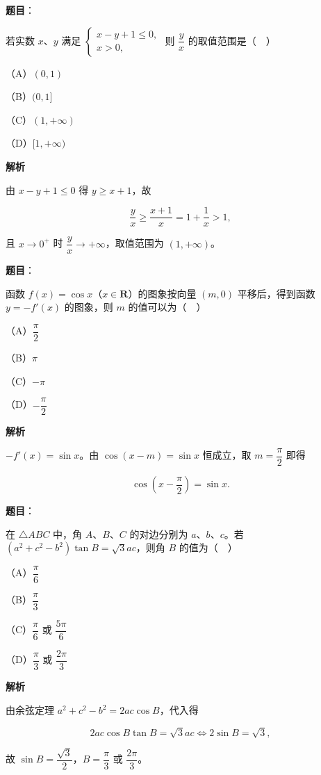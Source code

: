 \begin{answer}

\textbf{题目}：

若实数 $x$、$y$ 满足 $\begin{cases}x-y+1\leqslant0,\\ x>0,\end{cases}$ 则 $\dfrac yx$ 的取值范围是（　）

（A）$(0,1)$

（B）$(0,1]$

（C）$(1,+\infty)$

（D）$[1,+\infty)$

\textbf{解析}

由 $x-y+1\leqslant0$ 得 $y\geqslant x+1$，故

\nopagebreak[4]
\[\frac yx\geqslant\frac{x+1}x=1+\frac1x>1,\]

且 $x\to0^+$ 时 $\dfrac yx\to+\infty$，取值范围为 $(1,+\infty)$。


\end{answer}
\begin{answer}

\textbf{题目}：

函数 $f(x)=\cos x$（$x\in\mathbf R$）的图象按向量 $(m,0)$ 平移后，得到函数 $y=-f'(x)$ 的图象，则 $m$ 的值可以为（　）

（A）$\dfrac{\pi}{2}$

（B）$\pi$

（C）$-\pi$

（D）$-\dfrac{\pi}{2}$

\textbf{解析}

$-f'(x)=\sin x$。由 $\cos(x-m)=\sin x$ 恒成立，取 $m=\dfrac{\pi}2$ 即得

\nopagebreak[4]
\[\cos\left(x-\frac{\pi}2\right)=\sin x.\]


\end{answer}
\begin{answer}

\textbf{题目}：

在 $\triangle ABC$ 中，角 $A$、$B$、$C$ 的对边分别为 $a$、$b$、$c$。若 $(a^2+c^2-b^2)\tan B=\sqrt3ac$，则角 $B$ 的值为（　）

（A）$\dfrac{\pi}{6}$

（B）$\dfrac{\pi}{3}$

（C）$\dfrac{\pi}{6}$ 或 $\dfrac{5\pi}{6}$

（D）$\dfrac{\pi}{3}$ 或 $\dfrac{2\pi}{3}$

\textbf{解析}

由余弦定理 $a^2+c^2-b^2=2ac\cos B$，代入得

\nopagebreak[4]
\[2ac\cos B\tan B=\sqrt3ac\iff 2\sin B=\sqrt3,\]

故 $\sin B=\dfrac{\sqrt3}2$，$B=\dfrac{\pi}3$ 或 $\dfrac{2\pi}3$。


\end{answer}
